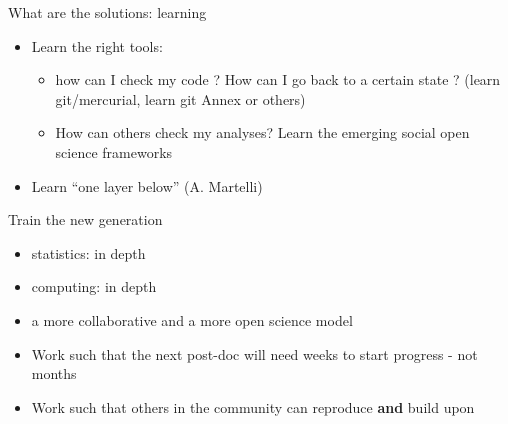 \begin{frame}{What are the solutions: learning}

\begin{itemize}
\itemsep1pt\parskip0pt
\item
  Learn the right tools:

  \begin{itemize}
  \itemsep1pt\parskip0pt
  \item
    how can I check my code ? How can I go back to a certain state ?
    (learn git/mercurial, learn git Annex or others)
  \item
    How can others check my analyses? Learn the emerging social open
    science frameworks
  \end{itemize}
\item
  Learn ``one layer below'' (A. Martelli)
\end{itemize}

\end{frame}

\begin{frame}{Train the new generation}

\begin{itemize}
\itemsep1pt\parskip0pt
\item
  statistics: in depth
\item
  computing: in depth
\item
  a more collaborative and a more open science model
\item
  Work such that the next post-doc will need weeks to start progress -
  not months
\item
  Work such that others in the community can reproduce \textbf{and}
  build upon
\end{itemize}

\end{frame}

